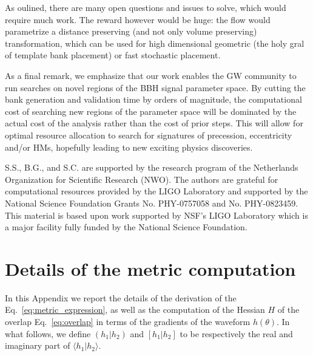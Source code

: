 \documentclass[twocolumn,showpacs,preprintnumbers,nofootinbib,prd,
superscriptaddress,10pt]{revtex4-2}
\newcommand{\scalar}[2]{\langle #1|#2 \rangle}
\newcommand{\rescalar}[2]{( #1 |#2 )}
\newcommand{\imscalar}[2]{[ #1|#2 ]}
\begin{document}
As oulined, there are many open questions and issues to solve, which would require much work. The reward however would be huge: the flow would parametrize a distance preserving (and not only volume preserving) transformation, which can be used for high dimensional geometric (the holy gral of template bank placement) or fast stochastic placement.


As a final remark, we emphasize that our work enables the GW community to run searches on novel regions of the BBH signal parameter space. By cutting the bank generation and validation time by orders of magnitude, the computational cost of searching new regions of the parameter space will be dominated by the actual cost of the analysis rather than the cost of prior steps.
This will allow for optimal resource allocation to search for signatures of precession, eccentricity and/or HMs, hopefully leading to new exciting physics discoveries.


        \begin{acknowledgments}
		S.S., B.G., and S.C. are supported by the research program of the Netherlands Organization for Scientific Research (NWO).
		The authors are grateful for computational resources provided by the LIGO Laboratory and supported by the National Science Foundation Grants No. PHY-0757058 and No. PHY-0823459. This material is based upon work supported by NSF’s LIGO Laboratory which is a major facility fully funded by the National Science Foundation.
        \end{acknowledgments}

\appendix

\section{Details of the metric computation}\label{app:metric}

In this Appendix we report the details of the derivation of the Eq.~\eqref{eq:metric_expression}, as well as the computation of the Hessian $H$ of the overlap Eq.~\eqref{eq:overlap} in terms of the gradients of the waveform $h(\theta)$. 
In what follows, we define $\rescalar{h_1}{h_2}$ and $\imscalar{h_1}{h_2}$ to be respectively the real and imaginary part of $\scalar{h_1}{h_2}$.
\end{document}
